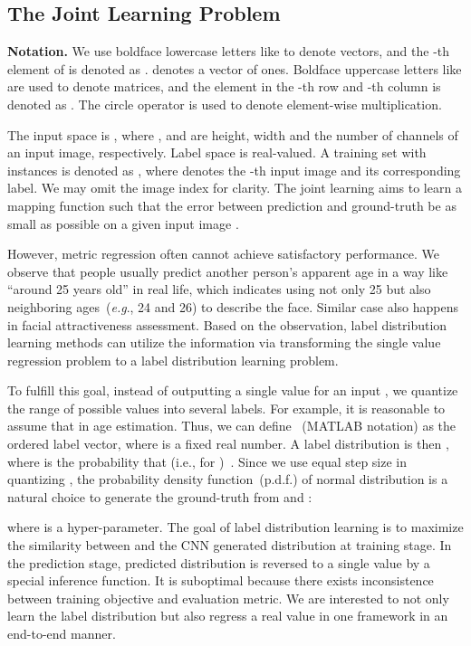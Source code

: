 \documentclass[5p,times,twocolumn]{elsarticle}
\makeatletter
\DeclareRobustCommand\onedot{\@onedot}
\def\@onedot{.}
\def\eg{\emph{e.g}\onedot}
\makeatother
\begin{document}
\subsection{The Joint Learning Problem}
\textbf{Notation.} We use boldface lowercase letters like  to denote vectors, and the -th element of  is denoted as .  denotes a vector of ones. Boldface uppercase letters like  are used to denote matrices, and the element in the -th row and -th column is denoted as . The circle operator  is used to denote element-wise multiplication.

The input space is , where ,  and  are height, width and the number of channels of an input image, respectively. Label space  is real-valued. A training set with  instances is denoted as , where  denotes the -th input image and  its corresponding label. We may omit the image index  for clarity. The joint learning aims to learn a mapping function  such that the error between prediction  and ground-truth  be as small as possible on a given input image . 

However, metric regression often cannot achieve satisfactory performance. We observe that people usually predict another person's apparent age in a way like ``around 25 years old'' in real life, which indicates using not only 25 but also neighboring ages~(\eg, 24 and 26) to describe the face. Similar case also happens in facial attractiveness assessment. Based on the observation, label distribution learning methods can utilize the information via transforming the single value regression problem to a label distribution learning problem. 

To fulfill this goal, instead of outputting a single value   for an input , we quantize the range of possible  values into several labels. For example, it is reasonable to assume that  in age estimation. Thus, we can define ~(MATLAB notation) as the ordered label vector, where  is a fixed real number. A label distribution  is then , where  is the probability that  (i.e.,  for )~\cite{gao2017deep}. Since we use equal step size  in quantizing , the probability density function~(p.d.f.) of normal distribution is a natural choice to generate the ground-truth  from  and :

where  is a hyper-parameter. The goal of label distribution learning is to maximize the similarity between  and the CNN generated distribution  at training stage. In the prediction stage, predicted distribution  is reversed to a single value by a special inference function. It is suboptimal because there exists inconsistence between training objective and evaluation metric. We are  interested to not only learn the label distribution  but also regress a real value  in one framework in an end-to-end manner.
\end{document}
